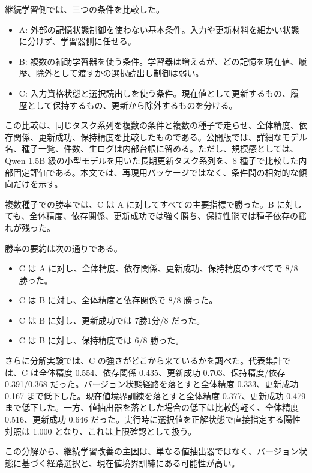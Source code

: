 \documentclass[12pt,a4paper]{article}
\begin{document}
継続学習側では、三つの条件を比較した。

\begin{itemize}
\tightlist
\item
  A: 外部の記憶状態制御を使わない基本条件。入力や更新材料を細かい状態に分けず、学習器側に任せる。
\item
  B: 複数の補助学習器を使う条件。学習器は増えるが、どの記憶を現在値、履歴、除外として渡すかの選択読出し制御は弱い。
\item
  C: 入力資格状態と選択読出しを使う条件。現在値として更新するもの、履歴として保持するもの、更新から除外するものを分ける。
\end{itemize}

この比較は、同じタスク系列を複数の条件と複数の種子で走らせ、全体精度、依存関係、更新成功、保持精度を比較したものである。公開版では、詳細なモデル名、種子一覧、件数、生ログは内部台帳に留める。ただし、規模感としては、Qwen 1.5B 級の小型モデルを用いた長期更新タスク系列を、8 種子で比較した内部固定評価である。本文では、再現用パッケージではなく、条件間の相対的な傾向だけを示す。

複数種子での勝率では、C は A に対してすべての主要指標で勝った。B に対しても、全体精度、依存関係、更新成功では強く勝ち、保持性能では種子依存の揺れが残った。

勝率の要約は次の通りである。

\begin{itemize}
\tightlist
\item
  C は A に対し、全体精度、依存関係、更新成功、保持精度のすべてで 8/8 勝った。
\item
  C は B に対し、全体精度と依存関係で 8/8 勝った。
\item
  C は B に対し、更新成功では 7勝1分/8 だった。
\item
  C は B に対し、保持精度では 6/8 勝った。
\end{itemize}

さらに分解実験では、C の強さがどこから来ているかを調べた。代表集計では、C は全体精度 0.554、依存関係 0.435、更新成功 0.703、保持精度/依存 0.391/0.368 だった。バージョン状態経路を落とすと全体精度 0.333、更新成功 0.167 まで低下した。現在値境界訓練を落とすと全体精度 0.377、更新成功 0.479 まで低下した。一方、値抽出器を落とした場合の低下は比較的軽く、全体精度 0.516、更新成功 0.646 だった。実行時に選択値を正解状態で直接指定する陽性対照は 1.000 となり、これは上限確認として扱う。

この分解から、継続学習改善の主因は、単なる値抽出器ではなく、バージョン状態に基づく経路選択と、現在値境界訓練にある可能性が高い。
\end{document}
